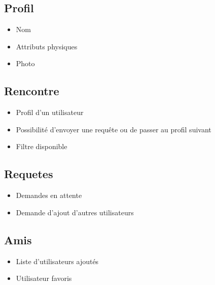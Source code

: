 \documentclass{beamer}
\begin{document}
\subsection{Profil}

\begin{frame}

	\begin{itemize}
	
	\item{
	Nom	
	}
	\item{
	Attributs physiques	
	}
	
	\item{
	Photo
	}
	\end{itemize}

\end{frame}

\subsection{Rencontre}
\begin{frame}
	\begin{itemize}
	\item{
	Profil d'un utilisateur
	}
	\item{
	Possibilité d'envoyer une requête ou de passer au profil suivant
	}
	\item{
	Filtre disponible
	}
	\end{itemize}
\end{frame}

\subsection{Requetes}
\begin{frame}
	\begin{itemize}
	\item{Demandes en attente}
	\item{
	Demande d'ajout d'autres utilisateurs
	}
	
	\end{itemize}
\end{frame}



\subsection{Amis}
\begin{frame}
	\begin{itemize}
	\item{
	Liste d'utilisateurs ajoutés
    
	}
	\item{Utilisateur favoris}
	
	\end{itemize}
\end{frame}
\end{document}

